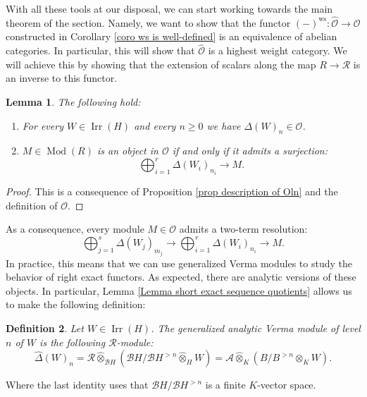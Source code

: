 \documentclass{amsart}
\newtheorem{defi}{ Definition}[subsection]
\newtheorem{Lemma}[defi]{Lemma}
\newcommand{\Mod}{\operatorname{Mod}}
\newcommand{\OX}{\mathcal{O}}
\begin{document}
With all these tools at our disposal, we can start working towards the main theorem of the section. Namely, we want to show that the functor $(-)^{\operatorname{ws}}:\widehat{\OX}\rightarrow \OX$ constructed in Corollary \ref{coro ws is well-defined} is an equivalence of abelian categories. In particular, this will show that $\widehat{\OX}$ is a highest weight category. We will achieve this by showing that the extension of scalars along the map $R\rightarrow \mathscr{R}$ is an inverse to this functor.
\begin{Lemma}\label{Lemma properties generalized Verma}
The following hold:
\begin{enumerate}[label=(\roman*)]
    \item For every $W\in\operatorname{Irr}(H)$ and every $n\geq 0$ we have $\Delta(W)_n\in \OX$.
    \item $M\in \Mod(R)$ is an object in $\OX$ if and only if it admits a surjection:
\begin{equation*}
     \bigoplus_{i=1}^r\Delta(W_i)_{n_i}\rightarrow M.
\end{equation*}
\end{enumerate}
\end{Lemma}
\begin{proof}
This is a consequence of Proposition \ref{prop description of Oln} and the definition of $\OX$.
\end{proof}
As a consequence, every module $M\in \OX$ admits a two-term resolution:
\begin{equation}\label{equation resolution by generalized Verma}
   \bigoplus_{j=1}^s\Delta(W_j)_{m_j}\rightarrow \bigoplus_{i=1}^r\Delta(W_i)_{n_i}\rightarrow M.
\end{equation}
In practice, this means that we can use generalized Verma modules to study the behavior of right exact functors. As expected, there are analytic versions of these objects. In particular, Lemma \ref{Lemma short exact sequence quotients} allows us to make the following definition:
\begin{defi}
Let $W\in \operatorname{Irr}(H)$. The generalized analytic Verma module of level $n$ of $W$ is the following $\mathscr{R}$-module:
\begin{equation*}
    \widehat{\Delta}(W)_n= \mathscr{R}\widehat{\otimes}_{\mathscr{B}H}\left(\mathscr{B}H/\mathscr{B}H^{>n}\widehat{\otimes}_{H} W \right)= \mathscr{A}\widehat{\otimes}_K(B/B^{>n}\otimes_KW).
\end{equation*}    
\end{defi}
Where the last identity uses that $\mathscr{B}H/\mathscr{B}H^{>n}$ is a finite $K$-vector space.
\end{document}
